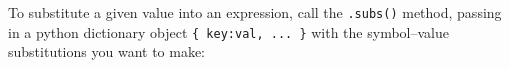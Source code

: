 \begin{comment}
\printcp

\noindent
You can define a sequence of variables using the following notation:
\small
\begin{verbatimtab}
>>> a0, a1, a2, a3 = symbols('a0:4')
\end{verbatimtab}
\normalsize

\noindent
You can use any name you want for a variable,
but it's best if you avoid the letters \texttt{Q,C,O,S,I,N} and \texttt{E} because they have special uses in \texttt{SymPy}:
\texttt{I} is the unit imaginary number $i\eqdef\sqrt{-1}$, 
\texttt{E} is the base of the natural logarithm,
\texttt{S()} is the \texttt{sympify} function,
\texttt{N()} is used to obtain numeric approximations, and
\texttt{O} is used for big-\texttt{O} notation.


\subsection{Expressions}
\label{basics:expressions}

\small
\begin{verbatimtab}
>>> from sympy import simplify, factor, expand, collect
\end{verbatimtab}
\normalsize

\noindent
You define \texttt{SymPy} expressions by combining symbols with basic math operations and other functions: 

\small
\begin{verbatimtab}
>>> expr = 2*x + 3*x - sin(x) - 3*x + 42
>>> simplify(expr)                   # simplify the expression
2*x - sin(x) + 42
\end{verbatimtab}
\normalsize

\noindent
The function \texttt{simplify} can be used on any expression to simplify it.
The examples below illustrate other useful \texttt{SymPy} functions
that correspond to common mathematical operations on expressions: 
																								\index{factoring} \index{expand} \index{collect}

\small
\begin{verbatimtab}
>>> factor( x**2-2*x-8 )             # factor a polynomial
(x - 4)*(x + 2)
>>> expand( (x-4)*(x+2) )            # expand and expression
x**2 - 2*x - 8
>>> collect(x**2 + x*b + a*x + a*b, x)    # collect like terms
x**2 + (a+b)*x + a*b
\end{verbatimtab}
\normalsize
\end{comment}
\noindent
To substitute a given value into an expression,																
call the \texttt{.subs()} method, passing in a python dictionary object \texttt{\{ key:val, ... \}} 
with the symbol--value substitutions you want to make:

